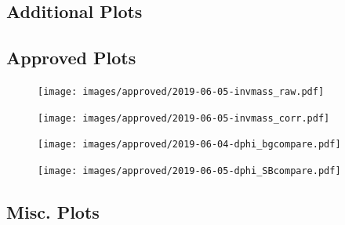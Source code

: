 \documentclass[ALICE,manyauthors]{ALICE_analysis_notes}
\begin{document}
\begin{itemize}
\clearpage
\section {Additional Plots}

\subsection{Approved Plots}

\begin{figure}[!htb]
\centering
\texttt{[image: images/approved/2019-06-05-invmass\_raw.pdf]}
\caption{}
\label{}
\end{figure}

\begin{figure}[!htb]
\centering
\texttt{[image: images/approved/2019-06-05-invmass\_corr.pdf]}
\caption{}
\label{}
\end{figure}

\begin{figure}[!htb]
\centering
\texttt{[image: images/approved/2019-06-04-dphi\_bgcompare.pdf]}
\caption{}
\label{}
\end{figure}

\begin{figure}[!htb]
\centering
\texttt{[image: images/approved/2019-06-05-dphi\_SBcompare.pdf]}
\caption{}
\label{}
\end{figure}

\begin{figure}[!htb]
\centering
\begin{subfigure}{
\texttt{[image: images/approved/2019-06-05-dphi\_hhall.pdf]}}
\end{subfigure}
\begin{subfigure}{
\texttt{[image: images/approved/2019-06-05-dphi\_hphiall.pdf]}
}
\end{subfigure}
\caption{}
\label{}
\end{figure}

\clearpage
\subsection{Misc. Plots}

\begin{figure}[!htb]
\centering
\begin{subfigure}{
\texttt{[image: images/addendum/hh\_50\_80\_fullbg.pdf]}
}
\end{subfigure}
\begin{subfigure}{
\texttt{[image: images/addendum/hphi\_50\_80\_fullbg.pdf]}
}
\end{subfigure}
\caption{}
\label{}
\end{figure}


\end{itemize}
\end{document}
